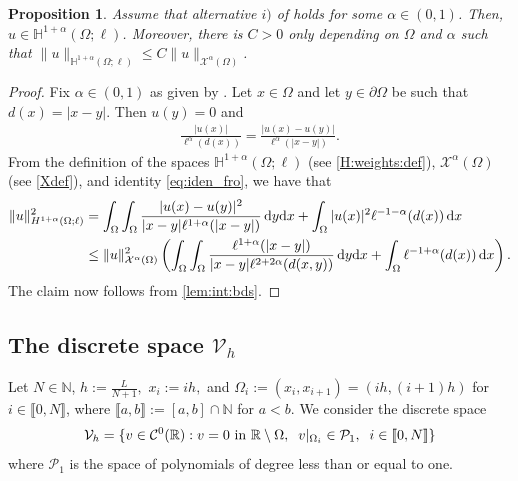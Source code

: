 \documentclass[11 pt]{article}
\newcommand\inter[1]{\llbracket #1\rrbracket}
\newtheorem{proposition}[theorem]{Proposition}
\numberwithin{equation}{section}
\def\R{\mathbb{R}}
\def\d{\textnormal{d}}
\begin{document}
\begin{proposition}\label{prop:more_regularity}
Assume that alternative $i)$ of  holds for some $\alpha\in(0,1)$. Then, $u\in \mathbb H^{1+\alpha}(\Omega;\ell)$. Moreover, there is $C>0$ only depending on $\Omega$ and $\alpha$ such that $\|u\|_{\mathbb H^{1+\alpha}(\Omega;\ell)}\leq C\|u\|_{\mathcal X^{\alpha}(\Omega)}$.
\end{proposition}
%
\begin{proof}
Fix $\alpha\in(0,1)$ as given by . Let $x\in \Omega$ and let $y\in\partial \Omega$ be such that $d(x)=|x-y|$. Then $u(y)=0$ and
%
\begin{align}\label{eq:iden_fro}
    \frac{|u(x)|}{\ell^{\alpha}(d(x))}=\frac{|u(x)-u(y)|}{\ell^{\alpha}(|x-y|)}.
\end{align}
%
From the definition of the spaces ${\mathbb H}^{1+\alpha}(\Omega;\ell)$ (see \eqref{H:weights:def}), $\mathcal X^\alpha(\Omega)$ (see \eqref{Xdef}), and identity \eqref{eq:iden_fro}, we have that
%
\begin{align*}\notag
    \|u\|^2_{H^{1+\alpha}(\Omega;\ell)}&=\int_{\Omega}\int_{\Omega}\frac{|u(x)-u(y)|^2}{|x-y|\ell^{1+\alpha}(|x-y|)}\, \d{y} \d{x}+\int_{\Omega}|u(x)|^2\ell^{-1-\alpha}(d(x))\,\d{x} \\
    &\leq \|u\|^2_{\mathcal X^{\alpha}(\Omega)}\left(\int_{\Omega}\int_{\Omega}\frac{\ell^{1+\alpha}(|x-y|)}{|x-y|\ell^{2+2\alpha}(d(x,y))}\,\d{y}\d{x}+ \int_{\Omega}\ell^{-1+\alpha}(d(x))\,\d{x}\right). %
\end{align*}
%
The claim now follows from \eqref{lem:int:bds}.
\end{proof}
%


\subsection{The discrete space
\texorpdfstring{$\mathcal V_h$}{Vh}
}

Let $N\in \mathbb N$, $h:=\frac{L}{N+1},$ $x_i:=ih,$ and $\Omega_i:=(x_i,x_{i+1})=(ih,(i+1)h)$ for $i\in\inter{0,N}$, where $\inter{a,b}:=[a,b]\cap\mathbb{N}$ for $a<b$. We consider the discrete space
%
\begin{equation}\label{Vh:def}
    \mathcal V_h=\{v\in \mathcal C^0(\R): v=0 \textnormal{ in } \R\setminus \Omega, \;\; v|_{\Omega_i}\in \mathcal P_1, \;\;  i\in\inter{0,N}\}
\end{equation}
%
where $\mathcal P_1$ is the space of polynomials of degree less than or equal to one. 
\end{document}
